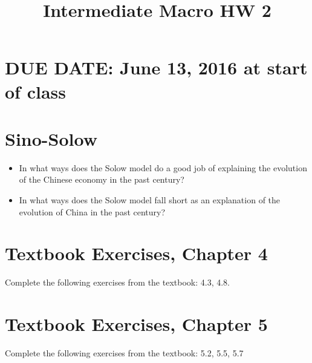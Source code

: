 \documentclass{article}
\begin{document}
\title{Intermediate Macro HW 2}

\maketitle

\section*{DUE DATE: June 13, 2016 at start of class}

\section{Sino-Solow}

\begin{itemize}
\item In what ways does the Solow model do a good job of explaining the evolution of the Chinese economy in the past century?

\item In what ways does the Solow model fall short as an explanation of the evolution of China in the past century?
\end{itemize}

\section{Textbook Exercises, Chapter 4}

Complete the following exercises from the textbook: 4.3, 4.8.

\section{Textbook Exercises, Chapter 5}

Complete the following exercises from the textbook: 5.2, 5.5, 5.7
\end{document}
